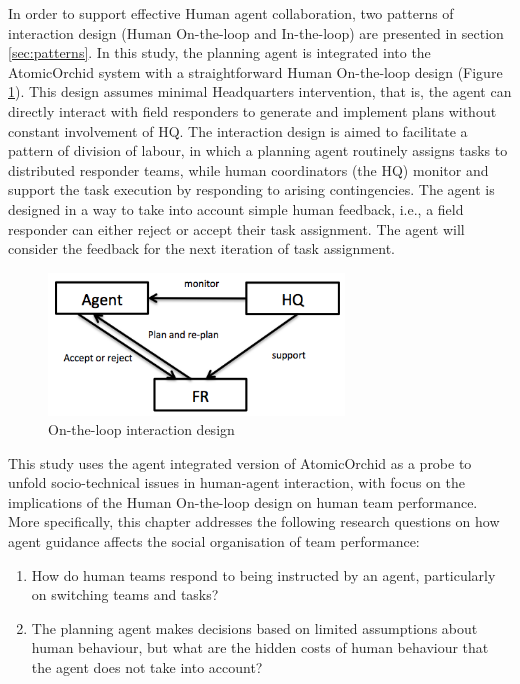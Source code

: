 In order to support effective Human agent collaboration, two patterns of interaction design (Human On-the-loop and In-the-loop) are presented in section \ref{sec:patterns}. In this study, the planning agent is integrated into the AtomicOrchid system with a straightforward Human On-the-loop design (Figure \ref{fig:study2OnTheLoop}). This design assumes minimal Headquarters intervention, that is, the agent can directly interact with field responders to generate and implement plans without constant involvement of HQ. The interaction design is aimed to facilitate a pattern of division of labour, in which a planning agent routinely assigns tasks to distributed responder teams, while human coordinators (the HQ) monitor and support the task execution by responding to arising contingencies. The agent is designed in a way to take into account simple human feedback, i.e., a field responder can either reject or accept their task assignment. The agent will consider the feedback for the next iteration of task assignment.\\

\begin{figure}[h]
  \centering
  \includegraphics[width=0.7\textwidth]{img/approach/OnTheLoop}
  \caption{On-the-loop interaction design}
  \label{fig:study2OnTheLoop}
\end{figure}

This study uses the agent integrated version of AtomicOrchid as a probe to unfold socio-technical issues in human-agent interaction, with focus on the implications of the Human On-the-loop design on human team performance. More specifically, this chapter addresses the following research questions on how agent guidance affects the social organisation of team performance:\\

\begin{enumerate}
\item How do human teams respond to being instructed by an agent, particularly on switching teams and tasks?\\
\item The planning agent makes decisions based on limited assumptions about human behaviour, but what are the hidden costs of human behaviour that the agent does not take into account?\\
\end{enumerate}

